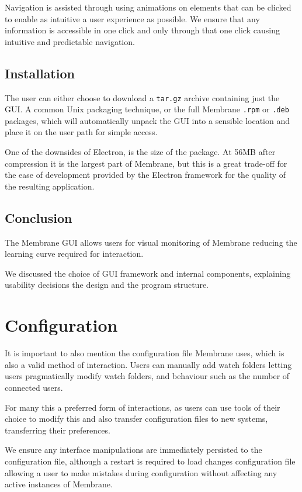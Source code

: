 \documentclass[11pt, a4paper, twocolumn, twoside]{report}
\def\code#1{\texttt{#1}}
\begin{document}
Navigation is assisted through using animations on elements that can be clicked to enable as intuitive a user experience as possible. We ensure that any information is accessible in one click and only through that one click causing intuitive and predictable navigation.

\subsection{Installation}

The user can either choose to download a \code{tar.gz} archive containing just the GUI. A common Unix packaging technique, or the full Membrane \code{.rpm} or \code{.deb} packages, which will automatically unpack the GUI into a sensible location and place it on the user path for simple access.

One of the downsides of Electron, is the size of the package. At 56MB after compression it is the largest part of Membrane, but this is a great trade-off for the ease of development provided by the Electron framework for the quality of the resulting application.

\subsection{Conclusion}

The Membrane GUI allows users for visual monitoring of Membrane reducing the learning curve required for interaction.

We discussed the choice of GUI framework and internal components, explaining usability decisions the design and the program structure.

\section{Configuration}

It is important to also mention the configuration file Membrane uses, which is also a valid method of interaction. Users can manually add watch folders letting users pragmatically modify watch folders, and behaviour such as the number of connected users.

For many this a preferred form of interactions, as users can use tools of their choice to modify this and also transfer configuration files to new systems, transferring their preferences.

We ensure any interface manipulations are immediately persisted to the configuration file, although a restart is required to load changes configuration file allowing a user to make mistakes during configuration without affecting any active instances of Membrane.
\end{document}
